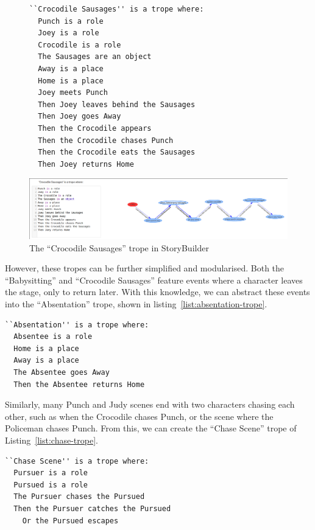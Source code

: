 \documentclass[11pt]{report}
\begin{document}
\begin{figure}[!t]
\begin{lstlisting}[label={lst:sausages-trope},caption={The ``Crocodile Sausages'' trope}]
``Crocodile Sausages'' is a trope where:
  Punch is a role
  Joey is a role
  Crocodile is a role
  The Sausages are an object
  Away is a place
  Home is a place
  Joey meets Punch
  Then Joey leaves behind the Sausages
  Then Joey goes Away
  Then the Crocodile appears
  Then the Crocodile chases Punch
  Then the Crocodile eats the Sausages
  Then Joey returns Home
\end{lstlisting}

\smallskip
\centerline{\includegraphics[width=\textwidth]{crocodile-trope.png}}
\caption{The ``Crocodile Sausages'' trope in StoryBuilder}\label{fig:crocodile-sausages}
\end{figure}

However, these tropes can be further simplified and modularised. Both the
``Babysitting'' and ``Crocodile Sausages'' feature events where a character
leaves the stage, only to return later. With this knowledge, we can abstract
these events into the ``Absentation'' trope, shown in
listing~\ref{list:absentation-trope}.

\begin{minipage}{\textwidth}
\begin{lstlisting}[label={list:absentation-trope},caption={An ``Absentation'' trope}]
``Absentation'' is a trope where:
  Absentee is a role
  Home is a place 
  Away is a place
  The Absentee goes Away
  Then the Absentee returns Home
\end{lstlisting}
\end{minipage}

Similarly, many Punch and Judy scenes end
with two characters chasing each other, such as when the Crocodile chases Punch,
or the scene where the Policeman chases Punch. From this, we can create the
``Chase Scene'' trope of Listing~\ref{list:chase-trope}.

\begin{minipage}{\textwidth}
\begin{lstlisting}[label={list:chase-trope},caption={A ``Chase Scene'' trope}]
``Chase Scene'' is a trope where:
  Pursuer is a role
  Pursued is a role
  The Pursuer chases the Pursued
  Then the Pursuer catches the Pursued
    Or the Pursued escapes
\end{lstlisting}
\end{minipage}
\end{document}
